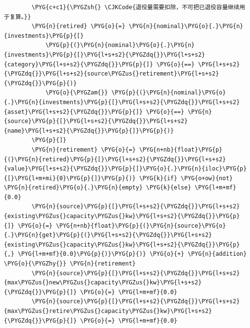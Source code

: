 \begin{Verbatim}
        \PYG{c+c1}{\PYGZsh{} \CJKCode{退役量需要扣除，不可把已退役容量继续用于复算。}}
        \PYG{n}{retired} \PYG{o}{=} \PYG{n}{nominal}\PYG{o}{.}\PYG{n}{investments}\PYG{p}{[}
            \PYG{p}{(}\PYG{n}{nominal}\PYG{o}{.}\PYG{n}{investments}\PYG{p}{[}\PYG{l+s+s2}{\PYGZdq{}}\PYG{l+s+s2}{category}\PYG{l+s+s2}{\PYGZdq{}}\PYG{p}{]} \PYG{o}{==} \PYG{l+s+s2}{\PYGZdq{}}\PYG{l+s+s2}{source\PYGZus{}retirement}\PYG{l+s+s2}{\PYGZdq{}}\PYG{p}{)}
            \PYG{o}{\PYGZam{}} \PYG{p}{(}\PYG{n}{nominal}\PYG{o}{.}\PYG{n}{investments}\PYG{p}{[}\PYG{l+s+s2}{\PYGZdq{}}\PYG{l+s+s2}{asset}\PYG{l+s+s2}{\PYGZdq{}}\PYG{p}{]} \PYG{o}{==} \PYG{n}{source}\PYG{p}{[}\PYG{l+s+s2}{\PYGZdq{}}\PYG{l+s+s2}{name}\PYG{l+s+s2}{\PYGZdq{}}\PYG{p}{]}\PYG{p}{)}
        \PYG{p}{]}
        \PYG{n}{retirement} \PYG{o}{=} \PYG{n+nb}{float}\PYG{p}{(}\PYG{n}{retired}\PYG{p}{[}\PYG{l+s+s2}{\PYGZdq{}}\PYG{l+s+s2}{value}\PYG{l+s+s2}{\PYGZdq{}}\PYG{p}{]}\PYG{o}{.}\PYG{n}{iloc}\PYG{p}{[}\PYG{l+m+mi}{0}\PYG{p}{]}\PYG{p}{)} \PYG{k}{if} \PYG{o+ow}{not} \PYG{n}{retired}\PYG{o}{.}\PYG{n}{empty} \PYG{k}{else} \PYG{l+m+mf}{0.0}
        \PYG{n}{source}\PYG{p}{[}\PYG{l+s+s2}{\PYGZdq{}}\PYG{l+s+s2}{existing\PYGZus{}capacity\PYGZus{}kw}\PYG{l+s+s2}{\PYGZdq{}}\PYG{p}{]} \PYG{o}{=} \PYG{n+nb}{float}\PYG{p}{(}\PYG{n}{source}\PYG{o}{.}\PYG{n}{get}\PYG{p}{(}\PYG{l+s+s2}{\PYGZdq{}}\PYG{l+s+s2}{existing\PYGZus{}capacity\PYGZus{}kw}\PYG{l+s+s2}{\PYGZdq{}}\PYG{p}{,} \PYG{l+m+mf}{0.0}\PYG{p}{)}\PYG{p}{)} \PYG{o}{+} \PYG{n}{addition} \PYG{o}{\PYGZhy{}} \PYG{n}{retirement}
        \PYG{n}{source}\PYG{p}{[}\PYG{l+s+s2}{\PYGZdq{}}\PYG{l+s+s2}{max\PYGZus{}new\PYGZus{}capacity\PYGZus{}kw}\PYG{l+s+s2}{\PYGZdq{}}\PYG{p}{]} \PYG{o}{=} \PYG{l+m+mf}{0.0}
        \PYG{n}{source}\PYG{p}{[}\PYG{l+s+s2}{\PYGZdq{}}\PYG{l+s+s2}{max\PYGZus{}retire\PYGZus{}capacity\PYGZus{}kw}\PYG{l+s+s2}{\PYGZdq{}}\PYG{p}{]} \PYG{o}{=} \PYG{l+m+mf}{0.0}


\end{Verbatim}
